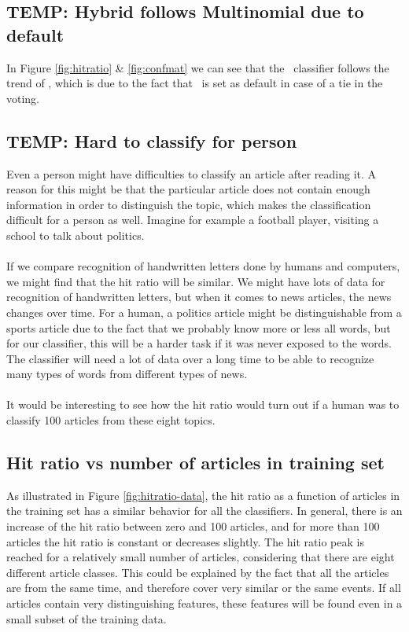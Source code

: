 \subsection{TEMP: Hybrid follows Multinomial due to default} %
\label{sub:temp_hybrid_follows_multinomial_due_to_default}
In Figure \ref{fig:hitratio} \& \ref{fig:confmat} we can see that the \hy\ classifier follows the trend of \mn, which is due to the fact that \mn\ is set as default in case of a tie in the voting.

\subsection{TEMP: Hard to classify for person} %
\label{sub:temp_hard_to_classify_for_person}
Even a person might have difficulties to classify an article after reading it. A reason for this might be that the particular article does not contain enough information in order to distinguish the topic, which makes the classification difficult for a person as well. Imagine for example a football player, visiting a school to talk about politics.
\\\\
If we compare recognition of handwritten letters done by humans and computers, we might find that the hit ratio will be similar. We might have lots of data for recognition of handwritten letters, but when it comes to news articles, the news changes over time. For a human, a politics article might be distinguishable from a sports article due to the fact that we probably know more or less all words, but for our classifier, this will be a harder task if it was never exposed to the words. The classifier will need a lot of data over a long time to be able to recognize many types of words from different types of news.
\\\\
It would be interesting to see how the hit ratio would turn out if a human was to classify 100 articles from these eight topics. 

\subsection{Hit ratio vs number of articles in training set}
As illustrated in Figure \ref{fig:hitratio-data}, the hit ratio as a function of articles in the training set has a similar behavior for all the classifiers. In general, there is an increase of the hit ratio between zero and 100 articles, and for more than 100 articles the hit ratio is constant or decreases slightly. The hit ratio peak is reached for a relatively small number of articles, considering that there are eight different article classes. This could be explained by the fact that all the articles are from the same time, and therefore cover very similar or the same events. If all articles contain very distinguishing features, these features will be found even in a small subset of the training data.

